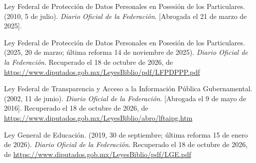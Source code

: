 \documentclass[12pt, a4paper]{article}
\begin{document}
\begin{list}{}{\setlength{\leftmargin}{1.27cm}\setlength{\itemindent}{-1.27cm}%
  \setlength{\labelwidth}{0pt}\setlength{\labelsep}{0pt}\setlength{\itemsep}{6pt}}
\item Ley Federal de Protección de Datos Personales en Posesión
  de los Particulares. (2010, 5 de julio). \textit{Diario Oficial
  de la Federación}. [Abrogada el 21 de marzo de 2025].


\item Ley Federal de Protección de Datos Personales en Posesión
  de los Particulares. (2025, 20 de marzo; última reforma 14 de
  noviembre de 2025). \textit{Diario Oficial de la Federación}. Recuperado el 18 de octubre de 2026, de \url{https://www.diputados.gob.mx/LeyesBiblio/pdf/LFPDPPP.pdf}


\item Ley Federal de Transparencia y Acceso a la Información
  Pública Gubernamental. (2002, 11 de junio). \textit{Diario
  Oficial de la Federación}. [Abrogada el 9 de mayo de 2016]. Recuperado el 18 de octubre de 2026, de \url{https://www.diputados.gob.mx/LeyesBiblio/abro/lftaipg.htm}

\item Ley General de Educación. (2019, 30 de septiembre; última
  reforma 15 de enero de 2026). \textit{Diario Oficial de la
Federación}. Recuperado el 18 de octubre de 2026, de \url{https://www.diputados.gob.mx/LeyesBiblio/pdf/LGE.pdf}
 
 

\end{list}
\end{document}
